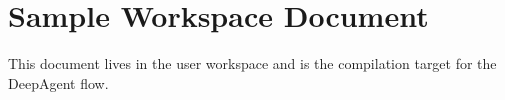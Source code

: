 \documentclass{article}
\begin{document}
\section*{Sample Workspace Document}

This document lives in the user workspace and is the compilation target for the DeepAgent flow.
\end{document}
